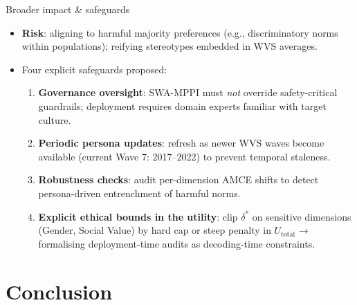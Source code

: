 \documentclass[10pt,aspectratio=169]{beamer}
\begin{document}
\begin{frame}{Broader impact \& safeguards}
  \begin{itemize}
    \item \textbf{Risk}: aligning to harmful majority preferences (e.g., discriminatory norms within populations); reifying stereotypes embedded in WVS averages.
    \item Four explicit safeguards proposed:
      \begin{enumerate}\small
        \item \textbf{Governance oversight}: SWA-MPPI must \emph{not} override safety-critical guardrails; deployment requires domain experts familiar with target culture.
        \item \textbf{Periodic persona updates}: refresh as newer WVS waves become available (current Wave 7: 2017--2022) to prevent temporal staleness.
        \item \textbf{Robustness checks}: audit per-dimension AMCE shifts to detect persona-driven entrenchment of harmful norms.
        \item \textbf{Explicit ethical bounds in the utility}: clip $\delta^\ast$ on sensitive dimensions (Gender, Social Value) by hard cap or steep penalty in $U_\text{total}$ → formalising deployment-time audits as decoding-time constraints.
      \end{enumerate}
  \end{itemize}
\end{frame}

\section{Conclusion}
\end{document}
